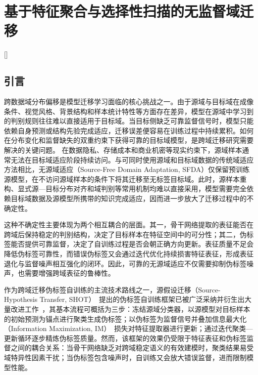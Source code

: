 
\chapter[基于特征聚合与选择性扫描的无监督域迁移]{基于特征聚合与选择性扫描的无监督域迁移}[]


\section{引言}

跨数据域分布偏移是模型迁移学习面临的核心挑战之一。由于源域与目标域在成像条件、视觉风格、背景结构和样本统计特性等方面存在差异，模型在源域中学习到的判别规则往往难以直接适用于目标域。当目标侧缺乏可靠监督信号时，模型只能依赖自身预测或结构先验完成适应，迁移误差便容易在训练过程中持续累积。如何在分布变化和监督缺失的双重约束下获得可靠的目标域模型，是跨域迁移研究需要解决的关键问题。
在数据隐私、存储成本和商业机密等现实约束下，源域样本通常无法在目标域适应阶段持续访问。与可同时使用源域和目标域数据的传统域适应方法相比，无源域适应（Source-Free Domain Adaptation, SFDA）仅保留预训练源模型，在不访问源域样本的条件下将其迁移至无标签目标域。此时，源样本重构、显式源—目标分布对齐和域判别等常用机制均难以直接采用，模型需要完全依赖目标域数据及源模型所携带的知识完成适应，因而进一步放大了迁移过程中的不确定性。

这种不确定性主要体现为两个相互耦合的层面。其一，骨干网络提取的表征能否在跨域后保持稳定的判别结构，决定了目标样本在特征空间中的可分性；其二，伪标签能否提供可靠监督，决定了自训练过程是否会朝正确方向更新。表征质量不足会降低伪标签可靠性，而错误伪标签又会通过迭代优化持续损害特征表征，形成表征退化与监督噪声相互强化的闭环。因此，可靠的无源域适应不仅需要抑制伪标签噪声，也需要增强跨域表征的鲁棒性。

作为跨域迁移伪标签自训练的主流技术路线之一，源假设迁移（Source-Hypothesis Transfer, SHOT）~\cite{liang2021source}提出的伪标签自训练框架已被广泛采纳并衍生出大量改进工作~\cite{fan2021dda,wang2025osda}，其基本流程可概括为三步：冻结源域分类器，以源模型对目标样本的初始预测为锚点进行聚类生成伪标签；以伪标签为监督信号并叠加信息最大化（Information Maximization, IM）~\cite{gomes2010discriminative}损失对特征提取器进行更新；通过迭代聚类—更新循环逐步精炼伪标签质量。然而，该框架的效果仍受限于特征表征和伪标签监督之间的耦合关系：当骨干网络缺乏对跨域稳定语义的有效建模时，聚类结果易受域特异性因素干扰；当伪标签包含噪声时，自训练又会放大错误监督，进而限制模型性能。

